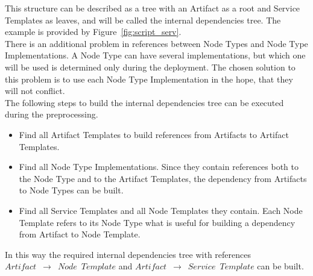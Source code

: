 This structure can be described as a tree with an Artifact as a root and Service Templates as leaves, and will be called the internal dependencies tree.
The example is provided by Figure~\ref{fig:script_serv}.\\
There is an additional problem in references between Node Types and Node Type Implementations.
A Node Type can have several implementations, but which one will be used is determined only during the deployment. 
The chosen solution to this problem is to use each Node Type Implementation in the hope, that they will not conflict.\\
The following steps to build the internal dependencies tree can be executed during the preprocessing.
\begin{itemize}
	\item Find all Artifact Templates to build references from Artifacts to Artifact Templates.
	\item Find all Node Type Implementations. 
		Since they contain references both to the Node Type and to the Artifact Templates, the dependency from Artifacts to Node Types can be built.
	\item Find all Service Templates and all Node Templates they contain. 
		Each Node Template refers to its Node Type what is useful for building a dependency from Artifact to Node Template.
\end{itemize} 
In this way the required internal dependencies tree with references \\$Artifact$~$\rightarrow$~$Node$~$Template$ and $Artifact$~$\rightarrow$~$Service$~$Template$ can be built.


